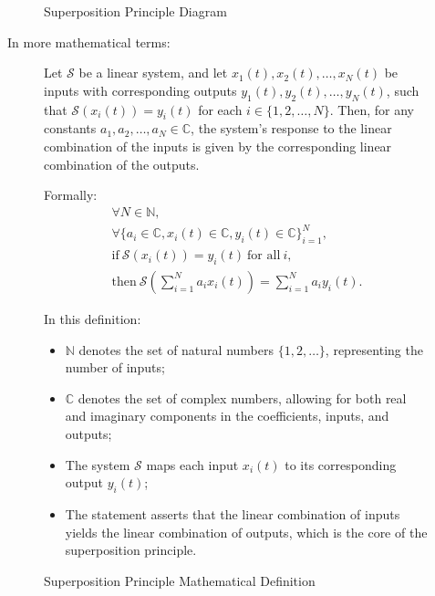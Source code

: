 \documentclass[../notes-main.tex]{subfiles}
\begin{document}
\begin{figure}[H]
\begin{mdframed}
\begin{center}
\begin{tikzpicture}[auto, thick, node distance=2cm, >=Latex]
            \end{tikzpicture}
                       
        \end{center}
    \end{mdframed}
    \vspace{-1em}\caption{Superposition Principle Diagram}\label{fig:superposition-principle-def-2}
\end{figure}
\vspace{-1em}
\newpage
\noindent In more mathematical terms:
\begin{figure}[H]
    \centering
    \begin{mdframed}
        \begin{center}
            Let \(\mathcal{S}\) be a linear system, and let \(x_1(t), x_2(t), \dots, x_N(t)\) be inputs with corresponding outputs \(y_1(t), y_2(t), \dots, y_N(t)\), such that \(\mathcal{S}(x_i(t)) = y_i(t)\) for each \(i \in \{1, 2, \dots, N\}\). Then, for any constants \(a_1, a_2, \dots, a_N \in \mathbb{C}\), the system's response to the linear combination of the inputs is given by the corresponding linear combination of the outputs.

            Formally:
            \begin{gather}
                \forall N \in \mathbb{N}, \\
                \forall \{a_i \in \mathbb{C}, x_i(t) \in \mathbb{C}, y_i(t) \in \mathbb{C}\}_{i=1}^N, \\
                \text{if} \ \mathcal{S}(x_i(t)) = y_i(t) \ \text{for all} \ i, \\
                \text{then} \ \mathcal{S}\left(\sum_{i=1}^{N} a_i x_i(t)\right) = \sum_{i=1}^{N} a_i y_i(t).
                \label{eq:linear-system-superposition-nerd}
            \end{gather}

            In this definition:
            \begin{itemize}
                \item \(\mathbb{N}\) denotes the set of natural numbers \(\{1,2,\dots\}\), representing the number of inputs;
                \item \(\mathbb{C}\) denotes the set of complex numbers, allowing for both real and imaginary components in the coefficients, inputs, and outputs;
                \item The system \(\mathcal{S}\) maps each input \(x_i(t)\) to its corresponding output \(y_i(t)\);
                \item The statement asserts that the linear combination of inputs yields the linear combination of outputs, which is the core of the superposition principle.
            \end{itemize}
        \end{center}
    \end{mdframed}
    \vspace{-1em}\caption{Superposition Principle Mathematical Definition}
\end{figure}
\end{document}
